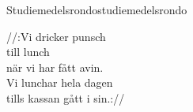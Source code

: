 \begin{song}{Studiemedelsrondo}{studiemedelsrondo}
\begin{vers}
//:Vi dricker punsch\\
till lunch\\
när vi har fått avin.\\
Vi lunchar hela dagen\\
tills kassan gått i sin.://\\
\end{vers}
\end{song}
